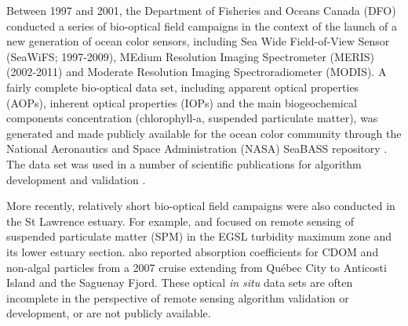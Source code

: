 \documentclass[essd, manuscript]{copernicus}
\begin{document}
Between 1997 and 2001, the Department of Fisheries and Oceans Canada (DFO) conducted a series of bio-optical field campaigns in the context of the launch of a new generation of ocean color sensors, including Sea Wide Field-of-View Sensor (SeaWiFS; 1997-2009), MEdium Resolution Imaging Spectrometer (MERIS) (2002-2011) and Moderate Resolution Imaging Spectroradiometer (MODIS). A fairly complete bio-optical data set, including apparent optical properties (AOPs), inherent optical properties (IOPs) and the main biogeochemical components concentration (chlorophyll-a, suspended particulate matter), was generated and made publicly available for the ocean color community through the National Aeronautics and Space Administration (NASA) SeaBASS repository \citep{werdell2002seawifs}. The data set was used in a number of scientific publications for algorithm development and validation \citep[e.g.,][]{LeFouest2006, Yayla2009, Cizmeli2008, Larouche2010, MontesHugo2012, MontesHugo2015}. 

More recently, relatively short bio-optical field campaigns were also conducted in the St Lawrence estuary. For example, \citet{Mohammadpour2015} and \citet{Mohammadpour2017}  focused on remote sensing of suspended particulate matter (SPM) in the EGSL turbidity maximum zone and its lower estuary section. \citet{Xie2012} also reported absorption coefficients for CDOM and non-algal particles from a 2007 cruise extending from Québec City to Anticosti Island and the Saguenay Fjord. These optical \textit{in situ} data sets are often incomplete in the perspective of remote sensing algorithm validation or development, or are not publicly available. 
 
\end{document}
